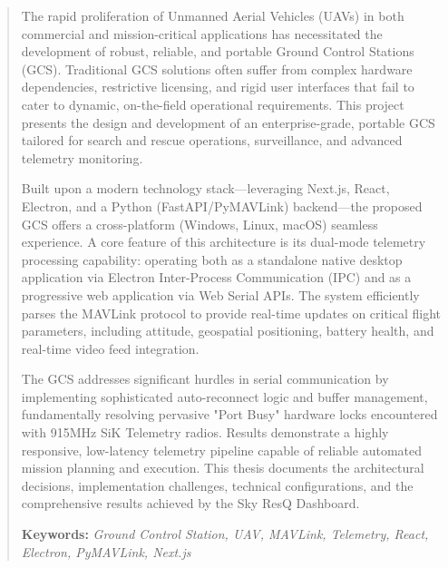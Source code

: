 \begin{abstract}
The rapid proliferation of Unmanned Aerial Vehicles (UAVs) in both commercial and mission-critical applications has necessitated the development of robust, reliable, and portable Ground Control Stations (GCS). Traditional GCS solutions often suffer from complex hardware dependencies, restrictive licensing, and rigid user interfaces that fail to cater to dynamic, on-the-field operational requirements. This project presents the design and development of an enterprise-grade, portable GCS tailored for search and rescue operations, surveillance, and advanced telemetry monitoring.

Built upon a modern technology stack—leveraging Next.js, React, Electron, and a Python (FastAPI/PyMAVLink) backend—the proposed GCS offers a cross-platform (Windows, Linux, macOS) seamless experience. A core feature of this architecture is its dual-mode telemetry processing capability: operating both as a standalone native desktop application via Electron Inter-Process Communication (IPC) and as a progressive web application via Web Serial APIs. The system efficiently parses the MAVLink protocol to provide real-time updates on critical flight parameters, including attitude, geospatial positioning, battery health, and real-time video feed integration.

The GCS addresses significant hurdles in serial communication by implementing sophisticated auto-reconnect logic and buffer management, fundamentally resolving pervasive "Port Busy" hardware locks encountered with 915MHz SiK Telemetry radios. Results demonstrate a highly responsive, low-latency telemetry pipeline capable of reliable automated mission planning and execution. This thesis documents the architectural decisions, implementation challenges, technical configurations, and the comprehensive results achieved by the Sky ResQ Dashboard.

\textbf{Keywords:} \textit{Ground Control Station, UAV, MAVLink, Telemetry, React, Electron, PyMAVLink, Next.js}
\end{abstract}

